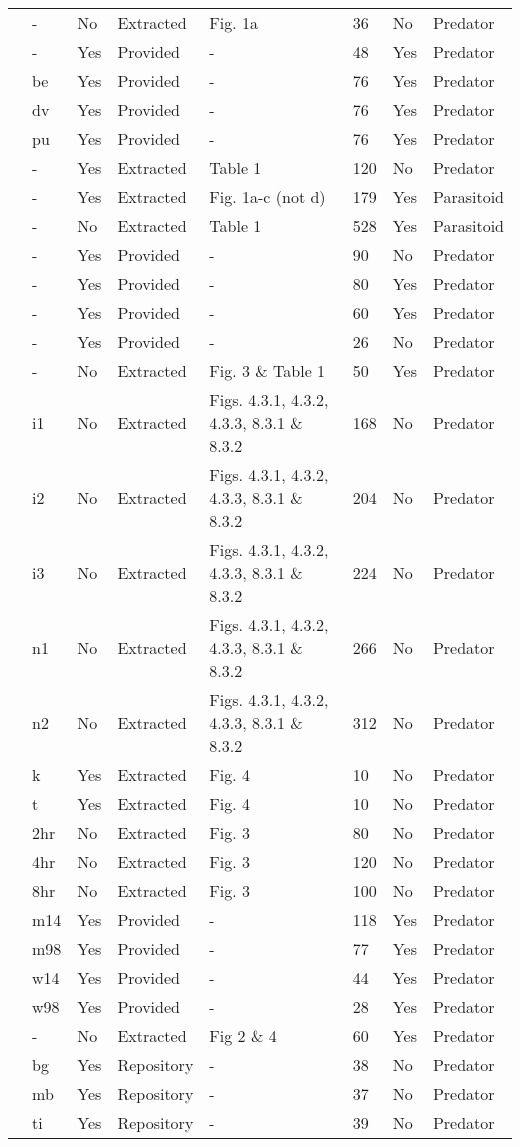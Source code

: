 \begin{longtable}{llllllll}
\citet{Mansour:1991aa}&-&No&Extracted&Fig. 1a&36&No&Predator\tabularnewline
\citet{Medoc:2013aa}&-&Yes&Provided&-&48&Yes&Predator\tabularnewline
\citet{Medoc:2015aa}&be&Yes&Provided&-&76&Yes&Predator\tabularnewline
\citet{Medoc:2015aa}&dv&Yes&Provided&-&76&Yes&Predator\tabularnewline
\citet{Medoc:2015aa}&pu&Yes&Provided&-&76&Yes&Predator\tabularnewline
\citet{Mertz:1968aa}&-&Yes&Extracted&Table 1&120&No&Predator\tabularnewline
\citet{Mills:2004aa}&-&Yes&Extracted&Fig. 1a-c (not d)&179&Yes&Parasitoid\tabularnewline
\citet{Montoya:2000aa}&-&No&Extracted&Table 1&528&Yes&Parasitoid\tabularnewline
\citet{Omkar:2004aa}&-&Yes&Provided&-&90&No&Predator\tabularnewline
\citet{Prokopenko:2017aa}&-&Yes&Provided&-&80&Yes&Predator\tabularnewline
\citet{Pusack:2018aa}&-&Yes&Provided&-&60&Yes&Predator\tabularnewline
\citet{Reeve:1997aa}&-&Yes&Provided&-&26&No&Predator\tabularnewline
\citet{Salt:1974aa}&-&No&Extracted&Fig. 3 \& Table 1&50&Yes&Predator\tabularnewline
\citet{Uttley:1980aa}&i1&No&Extracted&Figs. 4.3.1, 4.3.2, 4.3.3, 8.3.1 \& 8.3.2&168&No&Predator\tabularnewline
\citet{Uttley:1980aa}&i2&No&Extracted&Figs. 4.3.1, 4.3.2, 4.3.3, 8.3.1 \& 8.3.2&204&No&Predator\tabularnewline
\citet{Uttley:1980aa}&i3&No&Extracted&Figs. 4.3.1, 4.3.2, 4.3.3, 8.3.1 \& 8.3.2&224&No&Predator\tabularnewline
\citet{Uttley:1980aa}&n1&No&Extracted&Figs. 4.3.1, 4.3.2, 4.3.3, 8.3.1 \& 8.3.2&266&No&Predator\tabularnewline
\citet{Uttley:1980aa}&n2&No&Extracted&Figs. 4.3.1, 4.3.2, 4.3.3, 8.3.1 \& 8.3.2&312&No&Predator\tabularnewline
\citet{Vahl:2005aa}&k&Yes&Extracted&Fig. 4&10&No&Predator\tabularnewline
\citet{Vahl:2005aa}&t&Yes&Extracted&Fig. 4&10&No&Predator\tabularnewline
\citet{Von-Westernhagen:1976aa}&2hr&No&Extracted&Fig. 3&80&No&Predator\tabularnewline
\citet{Von-Westernhagen:1976aa}&4hr&No&Extracted&Fig. 3&120&No&Predator\tabularnewline
\citet{Von-Westernhagen:1976aa}&8hr&No&Extracted&Fig. 3&100&No&Predator\tabularnewline
\citet{Vucetich:2002aa}&m14&Yes&Provided&-&118&Yes&Predator\tabularnewline
\citet{Vucetich:2002aa}&m98&Yes&Provided&-&77&Yes&Predator\tabularnewline
\citet{Vucetich:2002aa}&w14&Yes&Provided&-&44&Yes&Predator\tabularnewline
\citet{Vucetich:2002aa}&w98&Yes&Provided&-&28&Yes&Predator\tabularnewline
\citet{Walde:1984aa}&-&No&Extracted&Fig 2 \& 4&60&Yes&Predator\tabularnewline
\citet{Wasserman:2016aa,Wasserman:2016ab}&bg&Yes&Repository&-&38&No&Predator\tabularnewline
\citet{Wasserman:2016aa,Wasserman:2016ab}&mb&Yes&Repository&-&37&No&Predator\tabularnewline
\citet{Wasserman:2016aa,Wasserman:2016ab}&ti&Yes&Repository&-&39&No&Predator\tabularnewline
\hline
\end{longtable}
